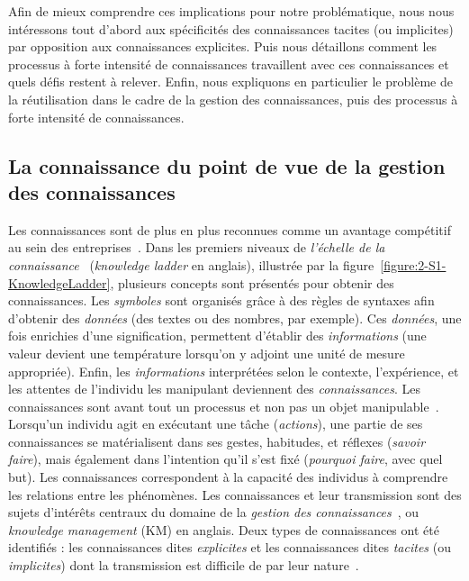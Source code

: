 Afin de mieux comprendre ces implications pour notre problématique, nous nous intéressons tout d'abord aux spécificités des connaissances tacites (ou implicites) par opposition aux connaissances explicites.
Puis nous détaillons comment les processus à forte intensité de connaissances travaillent avec ces connaissances et quels défis restent à relever.
Enfin, nous expliquons en particulier le problème de la réutilisation dans le cadre de la gestion des connaissances, puis des processus à forte intensité de connaissances.


\subsection{La connaissance du point de vue de la gestion des connaissances}
\label{subsection:Contexte:KIP-RevueLitterature:KM}

Les connaissances sont de plus en plus reconnues comme un avantage compétitif au sein des entreprises~\cite{abecker2000context}\cite{francca2012towards}\cite{hassen2016choosing}.
Dans les premiers niveaux de \textit{l'échelle de la connaissance}~\cite{north2018knowledge} (\og \textit{knowledge ladder} \fg en anglais), illustrée par la figure~\ref{figure:2-S1-KnowledgeLadder}, plusieurs concepts sont présentés pour obtenir des connaissances.
Les \textit{symboles} sont organisés grâce à des règles de syntaxes afin d'obtenir des \textit{données} (des textes ou des nombres, par exemple).
Ces \textit{données}, une fois enrichies d'une signification, permettent d'établir des \textit{informations} (une valeur devient une température lorsqu'on y adjoint une unité de mesure appropriée).
Enfin, les \textit{informations} interprétées selon le contexte, l'expérience, et les attentes de l'individu les manipulant deviennent des \textit{connaissances}.
Les connaissances sont avant tout un processus et non pas un objet manipulable~\cite{north2018knowledge}.
Lorsqu'un individu agit en exécutant une tâche (\textit{actions}), une partie de ses connaissances se matérialisent dans ses gestes, habitudes, et réflexes (\textit{savoir faire}), mais également dans l'intention qu'il s'est fixé (\textit{pourquoi faire}, avec quel but).
Les connaissances correspondent à la capacité des individus à comprendre les relations entre les phénomènes.
Les connaissances et leur transmission sont des sujets d'intérêts centraux du domaine de la \textit{gestion des connaissances}~\cite{syed2018palgrave}\cite{north2018knowledge}, ou \textit{knowledge management} (KM) en anglais.
Deux types de connaissances ont été identifiés : les connaissances dites \og \textit{explicites} \fg et les connaissances dites \og \textit{tacites} \fg (ou \textit{implicites}) dont la transmission est difficile de par leur nature~\cite{nonaka2007knowledge}.


